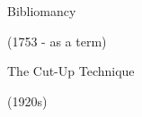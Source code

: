 \documentclass{beamer}
\begin{document}
\begin{frame}[c]
	\centering
	\Huge
	Bibliomancy
	
	(1753 - as a term)
\end{frame}

\begin{frame}[plain]
\end{frame}

\begin{frame}[c]
	\centering
	\Huge
	The Cut-Up Technique
	
	(1920s)
\end{frame}


\begin{frame}[plain]
\end{frame}
\end{document}
